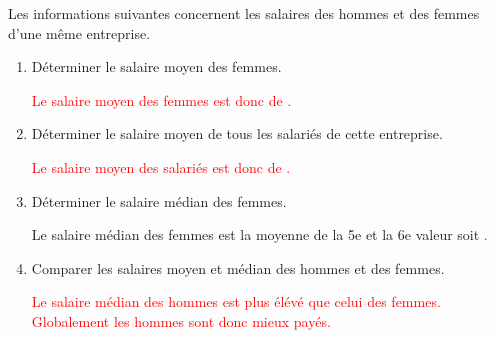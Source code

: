 \begin{corrige}
    Les informations suivantes concernent les salaires des hommes et des femmes d'une même entreprise.



    \begin{enumerate}
        \item Déterminer le salaire moyen des femmes.
        
        \textcolor{red}{}

        \textcolor{red}{Le salaire moyen des femmes est donc de \Prix{\Moyenne}.}
        \item Déterminer le salaire moyen de tous les salariés de cette entreprise.
        
        \textcolor{red}{}
        
        \textcolor{red}{Le salaire moyen des salariés est donc de .}
        \item Déterminer le salaire médian des femmes.
        
        Le salaire médian des femmes est la moyenne de la 5e et la 6e valeur soit \textcolor{red}{.}
    \end{enumerate}
    \Coupe
    \begin{enumerate}
        \setcounter{enumi}{3}
        \item Comparer les salaires moyen et médian des hommes et des femmes.
        
        \textcolor{red}{Le salaire médian des hommes est plus élévé que celui des femmes. Globalement les hommes sont donc mieux payés.}
    \end{enumerate}
\end{corrige}

